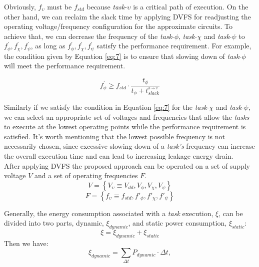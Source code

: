 \documentclass[journal]{IEEEtran}
\begin{document}
 Obviously, $f_\upsilon$ must be $f_{std}$ because \emph{task}-{$\upsilon$} is a critical path of execution. On the other hand, we can reclaim the slack time by applying DVFS for readjusting the operating voltage/frequency configuration for the approximate circuits. To achieve that, we can decrease the frequency of the \emph{task}-{$\phi$}, \emph{task}-{$\chi$} and \emph{task}-{$\psi$} to $f^{'}_\phi, f^{'}_\chi, f^{'}_\psi$, as long as $f^{'}_\phi, f^{'}_\chi, f^{'}_\psi$ satisfy the performance requirement. For example, the condition given by Equation \ref{eq:7} is to ensure that slowing down of \emph{task}-{$\phi$} will meet the performance requirement.


\begin{equation} \label{eq:7}
f^{'}_\phi  \geq  f_{std} \cdot \frac{t_\phi}{t_\phi + t^{_{\phi \rightarrow \upsilon}}_{slack}}
\end{equation}

Similarly if we satisfy the condition in Equation \ref{eq:7} for the \emph{task}-{$\chi$} and \emph{task}-{$\psi$}, we can select an appropriate set of voltages and frequencies that allow the \emph{tasks} to execute at the lowest operating points while the performance requirement is satisfied.
It's worth mentioning that the lowest possible frequency is not necessarily chosen, since excessive slowing down of a \emph{task's} frequency can increase the overall execution time and can lead to increasing leakage energy drain.\\


After applying DVFS the proposed approach can be operated on a set of supply voltage $V$ and a set of operating frequencies $F$.
\begin{equation} \label{eq:8}
V = \left \{ V_\upsilon \equiv V_{dd}, V_\phi ,V_\chi ,V_\psi \right \}
\end{equation}
\begin{equation} \label{eq:9}
F = \left \{ f_\upsilon \equiv f_{std}, f'_\phi ,f'_\chi ,f'_\psi \right \}
\end{equation}

Generally, the energy consumption associated with a \emph{task} execution, $\xi$, can be divided into two parts, dynamic, $\xi_{dynamic}$, and static power consumption, $\xi_{static}$: 
\cite{Kim2007} 
\begin{equation} \label{eq:10}
\xi = \xi_{dynamic} + \xi_{static}
\end{equation}  
Then we have:
\begin{equation} \label{eq:11}
\xi_{dynamic} = \sum_{\Delta t} P_{dynamic} \cdot \Delta t,
\end{equation}
\end{document}
